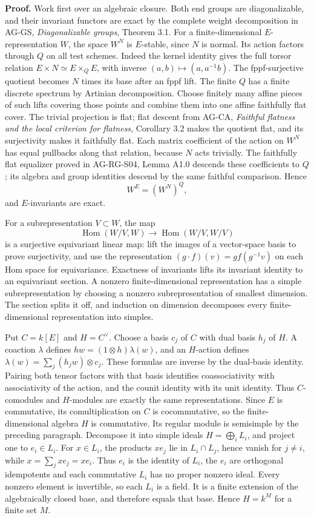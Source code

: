 \documentclass[11pt,a4paper,openany]{report}
\begin{document}
\textbf{Proof.} Work first over an algebraic closure. Both end groups are diagonalizable, and their invariant functors are exact by the complete weight decomposition in AG-GS, \emph{Diagonalizable groups}, Theorem 3.1. For a finite-dimensional \(E\)-representation \(W\), the space \(W^N\) is \(E\)-stable, since \(N\) is normal. Its action factors through \(Q\) on all test schemes. Indeed the kernel identity gives the full torsor relation \(E\times N\simeq E\times_Q E\), with inverse \((a,b)\mapsto(a,a^{-1}b)\). The fppf-surjective quotient becomes \(N\) times its base after an fppf lift. The finite \(Q\) has a finite discrete spectrum by Artinian decomposition. Choose finitely many affine pieces of such lifts covering those points and combine them into one affine faithfully flat cover. The trivial projection is flat; flat descent from AG-CA, \emph{Faithful flatness and the local criterion for flatness}, Corollary 3.2 makes the quotient flat, and its surjectivity makes it faithfully flat. Each matrix coefficient of the action on \(W^N\) has equal pullbacks along that relation, because \(N\) acts trivially. The faithfully flat equalizer proved in AG-RG-S04, Lemma A1.0 descends these coefficients to \(Q\); its algebra and group identities descend by the same faithful comparison. Hence \[
 W^E=(W^N)^Q,
\] and \(E\)-invariants are exact.

For a subrepresentation \(V\subset W\), the map \[
 \operatorname{Hom}(W/V,W)\longrightarrow\operatorname{Hom}(W/V,W/V)
\] is a surjective equivariant linear map: lift the images of a vector-space basis to prove surjectivity, and use the representation \((g\cdot f)(v)=g f(g^{-1}v)\) on each Hom space for equivariance. Exactness of invariants lifts its invariant identity to an equivariant section. A nonzero finite-dimensional representation has a simple subrepresentation by choosing a nonzero subrepresentation of smallest dimension. The section splits it off, and induction on dimension decomposes every finite-dimensional representation into simples.

Put \(C=k[E]\) and \(H=C^\vee\). Choose a basis \(c_j\) of \(C\) with dual basis \(h_j\) of \(H\). A coaction \(\lambda\) defines \(h w=(1\otimes h)\lambda(w)\), and an \(H\)-action defines \(\lambda(w)=\sum_j(h_j w)\otimes c_j\). These formulas are inverse by the dual-basis identity. Pairing both tensor factors with that basis identifies coassociativity with associativity of the action, and the counit identity with its unit identity. Thus \(C\)-comodules and \(H\)-modules are exactly the same representations. Since \(E\) is commutative, its comultiplication on \(C\) is cocommutative, so the finite-dimensional algebra \(H\) is commutative. Its regular module is semisimple by the preceding paragraph. Decompose it into simple ideals \(H=\bigoplus_i L_i\), and project one to \(e_i\in L_i\). For \(x\in L_i\), the products \(xe_j\) lie in \(L_i\cap L_j\), hence vanish for \(j\ne i\), while \(x=\sum_j xe_j=xe_i\). Thus \(e_i\) is the identity of \(L_i\), the \(e_i\) are orthogonal idempotents and each commutative \(L_i\) has no proper nonzero ideal. Every nonzero element is invertible, so each \(L_i\) is a field. It is a finite extension of the algebraically closed base, and therefore equals that base. Hence \(H=k^M\) for a finite set \(M\).
\end{document}
